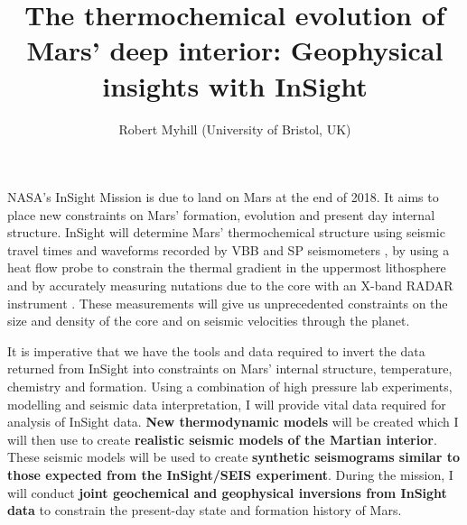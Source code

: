 \documentclass[11pt,twoside,a4paper]{article}
\date{}
\title{The thermochemical evolution of Mars' deep interior: Geophysical insights with InSight}
\author{Robert Myhill (University of Bristol, UK)}
\begin{document}
\maketitle

NASA's InSight Mission \citep{Banerdtetal2012} is due to land on Mars at the end of 2018. It aims to place new constraints on Mars' formation, evolution and present day internal structure. InSight will determine Mars' thermochemical structure using seismic travel times and waveforms \citep{KOHWDW2006, Teanby2015} recorded by VBB and SP seismometers \citep[the SEIS experiment;][]{Lognonneetal2014}, by using a heat flow probe \citep[HP3;][]{Spohnetal2012} to constrain the thermal gradient in the uppermost lithosphere and by accurately measuring nutations due to the core with an X-band RADAR instrument \citep[RISE;][]{Folkneretal2012}.  These measurements will give us unprecedented constraints on the size and density of the core and on seismic velocities through the planet. 

It is imperative that we have the tools and data required to invert the data returned from InSight into constraints on Mars' internal structure, temperature, chemistry and formation. Using a combination of high pressure lab experiments, modelling and seismic data interpretation, I will provide vital data required for analysis of InSight data. \textbf{New thermodynamic models} will be created which I will then use to create \textbf{realistic seismic models of the Martian interior}. These seismic models will be used to create \textbf{synthetic seismograms similar to those expected from the InSight/SEIS experiment}. During the mission, I will conduct \textbf{joint geochemical and geophysical inversions from InSight data} to constrain the present-day state and formation history of Mars.
\end{document}
